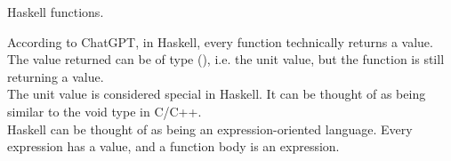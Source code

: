 \begin{frame}[t, fragile]{Haskell functions.}

According to ChatGPT, in Haskell, every function technically returns a value.
The value returned can be of type (), i.e. the unit value, but the
function is still returning a value. \\

The unit value is considered special in Haskell. It can be thought of as
being similar to the void type in C/C++. \\

Haskell can be thought of as being an expression-oriented language. Every
expression has a value, and a function body is an expression.

\end{frame}